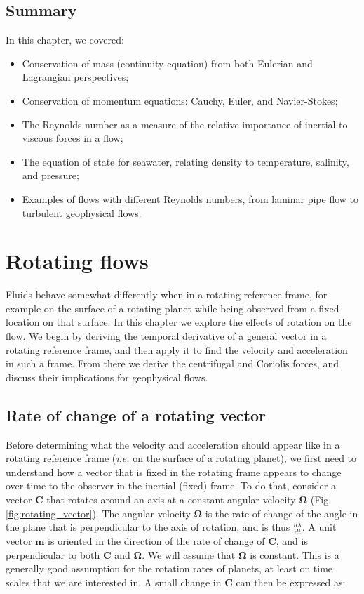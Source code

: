 \documentclass[12pt]{article}
\numberwithin{equation}{section}
\numberwithin{figure}{section}
\numberwithin{table}{section}
\begin{document}
\subsection*{Summary}

In this chapter, we covered:

\begin{itemize}
  \item Conservation of mass (continuity equation) from both Eulerian and
  Lagrangian perspectives;
  \item Conservation of momentum equations: Cauchy, Euler, and Navier-Stokes;
  \item The Reynolds number as a measure of the relative importance of inertial
  to viscous forces in a flow;
  \item The equation of state for seawater, relating density to temperature,
  salinity, and pressure;
  \item Examples of flows with different Reynolds numbers, from laminar pipe
  flow to turbulent geophysical flows.
\end{itemize}

\newpage
\section{Rotating flows}

Fluids behave somewhat differently when in a rotating reference frame, for
example on the surface of a rotating planet while being observed from a fixed
location on that surface.
In this chapter we explore the effects of rotation on the flow.
We begin by deriving the temporal derivative of a general vector in a rotating
reference frame, and then apply it to find the velocity and acceleration in such
a frame.
From there we derive the centrifugal and Coriolis forces, and discuss their
implications for geophysical flows.

\subsection{Rate of change of a rotating vector}

Before determining what the velocity and acceleration should appear like
in a rotating reference frame (\textit{i.e.} on the surface of a rotating planet), we
first need to understand how a vector that is fixed in the rotating frame
appears to change over time to the observer in the inertial (fixed) frame.
To do that, consider a vector $\mathbf{C}$ that rotates around an axis at a
constant angular velocity $\mathbf{\Omega}$ (Fig. \ref{fig:rotating_vector}).
The angular velocity $\mathbf{\Omega}$ is the rate of change of the angle in
the plane that is perpendicular to the axis of rotation, and is thus
$\frac{d\lambda}{dt}$.
A unit vector $\mathbf{m}$ is oriented in the direction of the rate of change
of $\mathbf{C}$, and is perpendicular to both $\mathbf{C}$ and $\mathbf{\Omega}$.
We will assume that $\mathbf{\Omega}$ is constant.
This is a generally good assumption for the rotation rates of planets, at least
on time scales that we are interested in.
A small change in $\mathbf{C}$ can then be expressed as:
\end{document}
